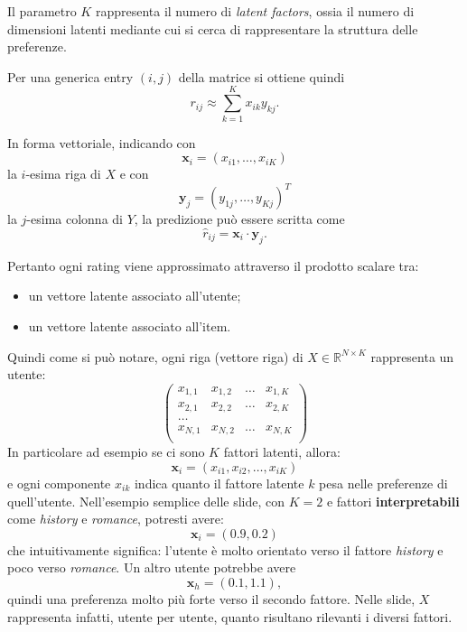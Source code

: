 Il parametro $K$ rappresenta il numero di \emph{latent factors}, ossia il numero di dimensioni latenti mediante cui si cerca di rappresentare la struttura delle preferenze.

Per una generica entry $(i,j)$ della matrice si ottiene quindi
\begin{equation*}
r_{ij}
\approx
\sum_{k=1}^{K} x_{ik} y_{kj}.
\end{equation*}

In forma vettoriale, indicando con
\[
\mathbf{x}_i
=
(x_{i1},\ldots,x_{iK})
\]
la $i$-esima riga di $X$ e con
\[
\mathbf{y}_j
=
(y_{1j},\ldots,y_{Kj})^{T}
\]
la $j$-esima colonna di $Y$, la predizione può essere scritta come
\[
\widehat r_{ij}
=
\mathbf{x}_i \cdot \mathbf{y}_j.
\]

Pertanto ogni rating viene approssimato attraverso il prodotto scalare tra:
\begin{itemize}
    \item un vettore latente associato all'utente;
    \item un vettore latente associato all'item.
\end{itemize}

Quindi come si può notare, ogni riga (vettore riga) di $X \in \mathbb{R}^{N \times K}$ rappresenta un utente:
\begin{equation}
    \begin{pmatrix}
        x_{1,1} & x_{1,2} & \dots & x_{1,K} \\
        x_{2,1} & x_{2,2} & \dots & x_{2,K} \\
        \dots \\
        x_{N,1} & x_{N,2} & \dots & x_{N,K} \\
    \end{pmatrix}
\end{equation}
In particolare ad esempio se ci sono $K$ fattori latenti, allora:
\[
\mathbf{x}_i = (x_{i1},x_{i2},\dots,x_{iK})
\]
e ogni componente \(x_{ik}\) indica quanto il fattore latente \(k\) pesa nelle preferenze di quell'utente.
Nell'esempio semplice delle slide, con \(K=2\) e fattori \textbf{interpretabili} come \emph{history} e \emph{romance}, potresti avere:
\[
\mathbf{x}_i=(0.9,0.2)
\]
che intuitivamente significa: l'utente è molto orientato verso il fattore \emph{history} e poco verso \emph{romance}. Un altro utente potrebbe avere
\[
\mathbf{x}_h=(0.1,1.1),
\]
quindi una preferenza molto più forte verso il secondo fattore. Nelle slide, \(X\) rappresenta infatti, utente per utente, quanto risultano rilevanti i diversi fattori.

